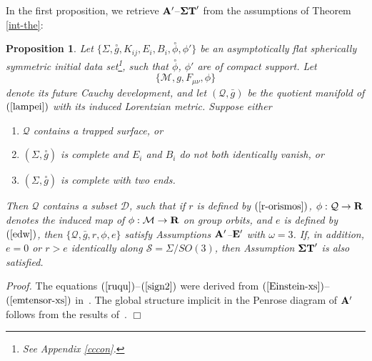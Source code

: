 \documentclass{article}
\newtheorem{proposition}{Proposition}[section]
\begin{document}
In the first proposition, we retrieve ${\bf A}'$--${\bf \Sigma T}'$
from the assumptions
of Theorem \ref{int-the}:
\begin{proposition}
\label{sxesntwvduo}
Let $\{\Sigma, \stackrel\circ{g}, K_{ij}, E_i, B_i, 
\stackrel{\circ}\phi, \phi'\}$ be an asymptotically flat spherically symmetric
initial data set\footnote{See Appendix \ref{cccon}.}, such 
that $\stackrel{\circ}\phi$, $\phi'$ are
of compact support. Let 
\begin{equation}
\label{lampei}
\{\mathcal{M},g,F_{\mu\nu},\phi\}
\end{equation}
denote its future Cauchy development, and let $(\mathcal{Q},\bar{g})$ be the quotient
manifold of $(\ref{lampei})$
with its induced Lorentzian metric.
Suppose either
\begin{enumerate}
\item
$\mathcal{Q}$ contains a trapped surface, \emph{or}
\item
$(\Sigma,\stackrel\circ{g})$ is complete
and $E_i$ and $B_i$ do not both identically vanish, \emph{or}
\item
$(\Sigma,\stackrel\circ{g})$ is complete with two ends. 
\end{enumerate}
Then $\mathcal{Q}$ contains a subset $\mathcal{D}$,
such that if 
$r$ is defined by
$(\ref{r-orismos})$,
 $\phi:\mathcal{Q}\to{\bf R}$ denotes
the induced map of $\phi:\mathcal{M}\to{\bf R}$ on group orbits, 
and $e$ is defined by $(\ref{edw})$,
then
$\{\mathcal{Q}, \bar{g}, r, \phi, e\}$ satisfy
Assumptions ${\bf A}'$--${\bf E}'$
with $\omega=3$. 
If, in addition, $e=0$ or
$r>e$ identically along $\mathcal{S}=\Sigma/SO(3)$, 
then Assumption ${\bf \Sigma T}'$ is also satisfied.
\end{proposition}

\noindent\emph{Proof.} The equations $(\ref{ruqu})$--$(\ref{sign2})$
were derived from $(\ref{Einstein-xs})$--$(\ref{emtensor-xs})$ 
in~\cite{md:si}. The global structure
implicit in the Penrose diagram of ${\bf A}'$ follows
from the results of~\cite{md:sssts}.
$\Box$ 
\end{document}
